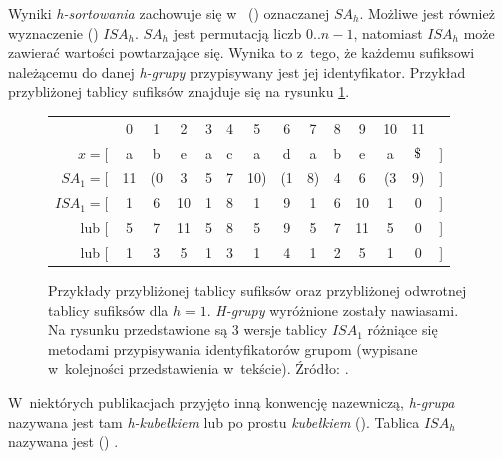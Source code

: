 \noindent
Wyniki \emph{h-sortowania} zachowuje się w~ () \cite{taxonomy} oznaczanej
$\textit{SA}_h$. Możliwe jest również wyznaczenie
() \cite{taxonomy} $\textit{ISA}_h$.
$\textit{SA}_h$ jest permutacją liczb $0..n-1$, natomiast
$\textit{ISA}_h$ może zawierać wartości powtarzające się. Wynika to z~tego,
że każdemu sufiksowi należącemu do danej \emph{h-grupy} przypisywany jest jej identyfikator.
Przykład przybliżonej tablicy sufiksów znajduje się na rysunku \ref{rys:approx-suffix-array}.

\begin{figure}[t]
    \begin{center}        
        \begin{tabular}{ r c c c c c c c c c c c c l}                           
                                 & 0  & 1  & 2  & 3 & 4 & 5   & 6  & 7  & 8 & 9  & 10 & 11     \\ \cmidrule{2-13} 
                         $x = [$ & a  & b  & e  & a & c & a   & d  & a  & b & e  & a  &
                       $\dollar$ &]\\ $\mathit{SA}_1 = [$ & 11 & (0 & 3  & 5 & 7 & 10) & (1 & 8) & 4 & 6  & (3 & 9)   & ] \\ 
            $\mathit{ISA}_1 = [$ & 1  & 6  & 10 & 1 & 8 & 1   & 9  & 1  & 6 & 10 & 1  & 0    & ]\\
                           lub [ & 5  & 7  & 11 & 5 & 8 & 5   & 9  & 5  & 7 & 11 & 5  & 0    & ]\\
                           lub [ & 1  & 3  & 5  & 1 & 3 & 1   & 4  & 1  & 2 & 5  & 1  & 0    & ]\\
        \end{tabular}            
    \end{center}                         
\caption{Przykłady przybliżonej tablicy sufiksów oraz przybliżonej 
odwrotnej tablicy sufiksów dla $h=1$. \emph{H-grupy}
wyróżnione zostały nawiasami. Na rysunku przedstawione są 3 wersje tablicy
$\textit{ISA}_1$ różniące się metodami przypisywania identyfikatorów grupom 
(wypisane w~kolejności przedstawienia w~tekście).  Źródło: \cite{taxonomy}.}%
\label{rys:approx-suffix-array}
\end{figure}

W~niektórych publikacjach przyjęto inną konwencję nazewniczą, \emph{h-grupa} nazywana
jest tam \emph{h-kubełkiem} lub po prostu \emph{kubełkiem} ().
Tablica $\textit{ISA}_h$ nazywana jest  
() \cite{schurmann-phd}.
